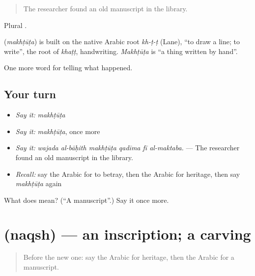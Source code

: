 \begin{quote}
The researcher found an old manuscript in the library.
\end{quote}

Plural .

\begin{cousinweb}
\textbf{} (\emph{makhṭūṭa}) is built on the native Arabic root \emph{kh-ṭ-ṭ} (Lane), \textquotedblleft{}to draw a line; to write\textquotedblright{}, the root of \emph{khaṭṭ}, handwriting. \emph{Makhṭūṭa} is \textquotedblleft{}a thing written by hand\textquotedblright{}.
\end{cousinweb}

\begin{grammarlens}[title={What you've built}]
One more word for telling what happened.
\end{grammarlens}

\subsection*{Your turn}
\begin{itemize}
\raggedright
  \item \emph{Say it:} \emph{makhṭūṭa}
  \item \emph{Say it:} \emph{makhṭūṭa}, once more
  \item \emph{Say it:} \emph{wajada al-bāḥith makhṭūṭa qadīma fī al-maktaba.} — The researcher found an old manuscript in the library.
  \item \emph{Recall:} say the Arabic for to betray, then the Arabic for heritage, then say \emph{makhṭūṭa} again
\end{itemize}

\begin{tcolorbox}[breakable,colback=teal!4,colframe=teal!35!black,title={Before you move on}]
What does  mean? (\textquotedblleft{}A manuscript\textquotedblright{}.) Say it once more.
\end{tcolorbox}
\section[\texorpdfstring{\ar{نقش} (naqsh)}{نقش (naqsh)}]{ (naqsh) — an inscription; a carving}

\label{lesson:AR-C342-naqsh}



\begin{quote}
Before the new one: say the Arabic for heritage, then the Arabic for a manuscript.
\end{quote}

